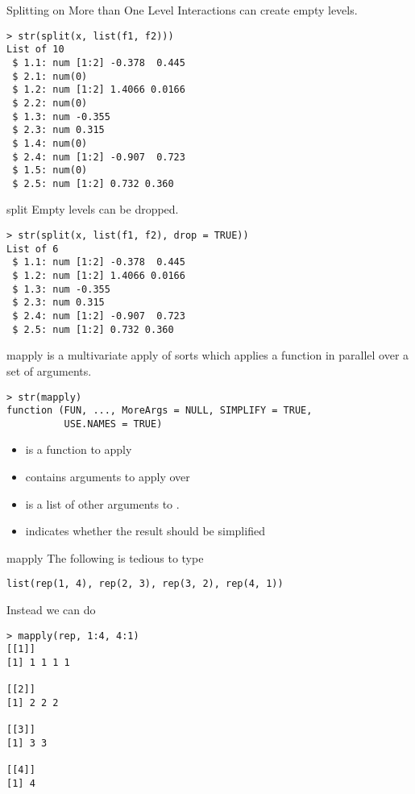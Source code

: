 \documentclass[aspectratio=169]{beamer}
\begin{document}
\begin{frame}[fragile]{Splitting on More than One Level}
Interactions can create empty levels.
\begin{verbatim}
> str(split(x, list(f1, f2)))
List of 10
 $ 1.1: num [1:2] -0.378  0.445
 $ 2.1: num(0) 
 $ 1.2: num [1:2] 1.4066 0.0166
 $ 2.2: num(0) 
 $ 1.3: num -0.355
 $ 2.3: num 0.315
 $ 1.4: num(0) 
 $ 2.4: num [1:2] -0.907  0.723
 $ 1.5: num(0) 
 $ 2.5: num [1:2] 0.732 0.360
\end{verbatim}
\end{frame}

\begin{frame}[fragile]{split}
Empty levels can be dropped.
\begin{verbatim}
> str(split(x, list(f1, f2), drop = TRUE))
List of 6
 $ 1.1: num [1:2] -0.378  0.445
 $ 1.2: num [1:2] 1.4066 0.0166
 $ 1.3: num -0.355
 $ 2.3: num 0.315
 $ 2.4: num [1:2] -0.907  0.723
 $ 2.5: num [1:2] 0.732 0.360
\end{verbatim}
\end{frame}




\begin{frame}[fragile]{mapply}
 is a multivariate apply of sorts which applies a
function in parallel over a set of arguments.
\begin{verbatim}
> str(mapply)
function (FUN, ..., MoreArgs = NULL, SIMPLIFY = TRUE, 
          USE.NAMES = TRUE)
\end{verbatim}
\begin{itemize}
\item
{} is a function to apply
\item
{} contains arguments to apply over
\item
{} is a list of other arguments to .
\item
{} indicates whether the result should be simplified
\end{itemize}
\end{frame}


\begin{frame}[fragile]{mapply}
The following is tedious to type
\begin{verbatim}
list(rep(1, 4), rep(2, 3), rep(3, 2), rep(4, 1))
\end{verbatim}
Instead we can do
\begin{verbatim}
> mapply(rep, 1:4, 4:1)
[[1]]
[1] 1 1 1 1

[[2]]
[1] 2 2 2

[[3]]
[1] 3 3

[[4]]
[1] 4
\end{verbatim}
\end{frame}
\end{document}
